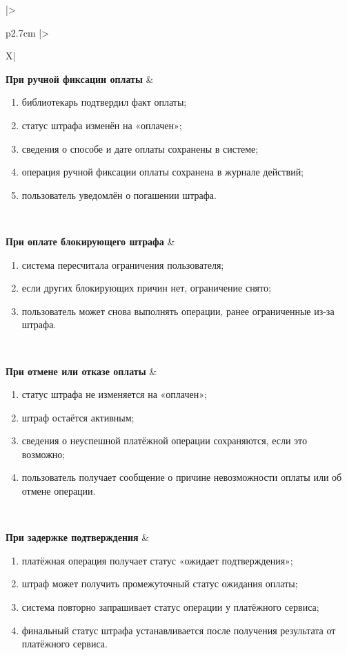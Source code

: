 \documentclass[12pt,a4paper]{article}
\begin{document}
\begin{xltabular}{\textwidth}{
				|>{\raggedright\arraybackslash}p{2.7cm}
				|>{\raggedright\arraybackslash}X|
			}
			\textbf{При ручной фиксации оплаты} &
			\begin{enumerate}
				\item библиотекарь подтвердил факт оплаты;
				\item статус штрафа изменён на «оплачен»;
				\item сведения о способе и дате оплаты сохранены в системе;
				\item операция ручной фиксации оплаты сохранена в журнале действий;
				\item пользователь уведомлён о погашении штрафа.
			\end{enumerate} \\
			\hline
			
			\textbf{При оплате блокирующего штрафа} &
			\begin{enumerate}
				\item система пересчитала ограничения пользователя;
				\item если других блокирующих причин нет, ограничение снято;
				\item пользователь может снова выполнять операции, ранее
				ограниченные из-за штрафа.
			\end{enumerate} \\
			\hline
			
			\textbf{При отмене или отказе оплаты} &
			\begin{enumerate}
				\item статус штрафа не изменяется на «оплачен»;
				\item штраф остаётся активным;
				\item сведения о неуспешной платёжной операции сохраняются, если это
				возможно;
				\item пользователь получает сообщение о причине невозможности оплаты
				или об отмене операции.
			\end{enumerate} \\
			\hline
			
			\textbf{При задержке подтверждения} &
			\begin{enumerate}
				\item платёжная операция получает статус «ожидает подтверждения»;
				\item штраф может получить промежуточный статус ожидания оплаты;
				\item система повторно запрашивает статус операции у платёжного
				сервиса;
				\item финальный статус штрафа устанавливается после получения
				результата от платёжного сервиса.
			\end{enumerate} \\
			\hline
			

\end{xltabular}
\end{document}
